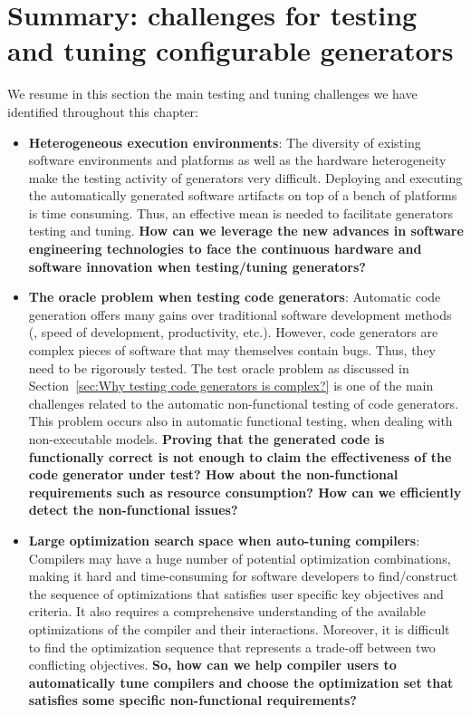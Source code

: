 \section{Summary: challenges for testing and tuning configurable generators}
\label{bg:Summary: Testing and optimization challenges}
We resume in this section the main testing and tuning challenges we have identified throughout this chapter:
\begin{itemize}
	\item \textbf{Heterogeneous execution environments}: 
	The diversity of existing software environments and platforms as well as the hardware heterogeneity make the testing activity of generators very difficult. Deploying and executing the automatically generated software artifacts on top of a bench of platforms is time consuming. Thus, an effective mean is needed to facilitate generators testing and tuning.
	\textbf{How can we leverage the new advances in software engineering technologies to face the continuous hardware and software innovation when testing/tuning generators?} 
	
    \item \textbf{The oracle problem when testing code generators}: 	
	Automatic code generation offers many gains over traditional software development methods (\eg, speed of development, productivity, etc.). However, code generators are complex pieces of software that may themselves contain bugs. Thus, they need to be rigorously tested. The test oracle problem as discussed in Section~\ref{sec:Why testing code generators is complex?} is one of the main challenges related to the automatic non-functional testing of code generators. This problem occurs also in automatic functional testing, when dealing with non-executable models.
	\textbf{
	Proving that the generated code is functionally correct is not enough to claim the effectiveness of the code generator under test? How about the non-functional requirements such as resource consumption?
	How can we efficiently detect the non-functional issues?}
	
	\item \textbf{Large optimization search space when auto-tuning compilers}: 
	Compilers may have a huge number of potential optimization combinations, making it hard and time-consuming for software developers to find/construct the sequence of optimizations that satisfies user specific key objectives and criteria. It also requires a comprehensive understanding of the available optimizations of the compiler and their interactions. Moreover, it is difficult to find the optimization sequence that represents a trade-off between two conflicting objectives.  
	\textbf{So, how can we help compiler users to automatically tune compilers and choose the optimization set that satisfies some specific non-functional requirements? }
	

\end{itemize}
